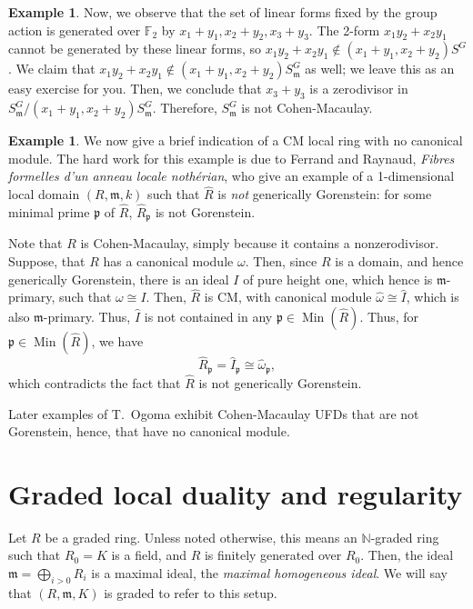 \documentclass[11pt]{book}
\numberwithin{equation}{section}
\numberwithin{theorem}{chapter}
\theoremstyle{definition}
\newtheorem{example}[theorem]{Example}
\newtheorem*{basic properties}{Basic Properties}
\newtheorem*{Important Remark}{Important Remark}
\theoremstyle{remark}
\newcommand{\NN}{\mathbb{N}}
\newcommand{\FF}{\mathbb{F}}
\newcommand{\m}{\mathfrak{m}}
\newcommand{\p}{\mathfrak{p}}
\newcommand{\Min}{\operatorname{Min}}
\begin{document}
\begin{example}
  Now, we observe that the set of linear forms fixed by the group action is generated over $\FF_2$ by $x_1+y_1, x_2+y_2, x_3+y_3$. The 2-form $x_1 y_2 + x_2 y_1$ cannot be generated by these linear forms, so $x_1 y_2 + x_2 y_1 \notin (x_1+y_1, x_2+ y_2 )S^G$. We claim that $x_1 y_2 + x_2 y_1 \notin (x_1+y_1, x_2+ y_2 )S^G_\m$ as well; we leave this as an easy exercise for you. Then, we conclude that $x_3+y_3$ is a zerodivisor in $S^G_\m / (x_1+y_1, x_2+ y_2 )S^G_\m$. Therefore, $S^G_\m$ is not Cohen-Macaulay.
\end{example}

\begin{example}
	We now give a brief indication of a CM local ring with no canonical module. The hard work for this example is due to Ferrand and Raynaud, \emph{Fibres formelles d'un anneau locale noth\'erian}, who give an example of a 1-dimensional local domain $(R,\m,k)$ such that $\widehat{R}$ is \emph{not} generically Gorenstein: for some minimal prime $\p$ of $\widehat{R}$, $\widehat{R}_\p$ is not Gorenstein.
	
	Note that $R$ is Cohen-Macaulay, simply because it contains a nonzerodivisor. Suppose, that $R$ has a canonical module $\omega$. Then, since $R$ is a domain, and hence generically Gorenstein, there is an ideal $I$ of pure height one, which hence is $\m$-primary, such that $\omega\cong I$. Then, $\widehat{R}$ is CM, with canonical module $\widehat{\omega}\cong \widehat{I}$, which is also $\m$-primary. Thus, $\widehat{I}$ is not contained in any $\p\in \Min(\widehat{R})$. Thus, for $\p\in \Min(\widehat{R})$, we have 
	\[ \widehat{R}_{\p} = \widehat{I}_{\p} \cong \widehat{\omega}_{\p}, \]
	which contradicts the fact that $\widehat{R}$ is not generically Gorenstein.
\end{example}

Later examples of T.~Ogoma exhibit Cohen-Macaulay UFDs that are not Gorenstein, hence, that have no canonical module.


\section{Graded local duality and regularity}

Let $R$ be a graded ring. Unless noted otherwise, this means an $\NN$-graded ring such that $R_0=K$ is a field, and $R$ is finitely generated over $R_0$. Then, the ideal $\m=\bigoplus_{i>0} R_i$ is a maximal ideal, the \emph{maximal homogeneous ideal}. We will say that $(R,\m,K)$\index{$(R,\m,K)$} is graded to refer to this setup.
\end{document}
